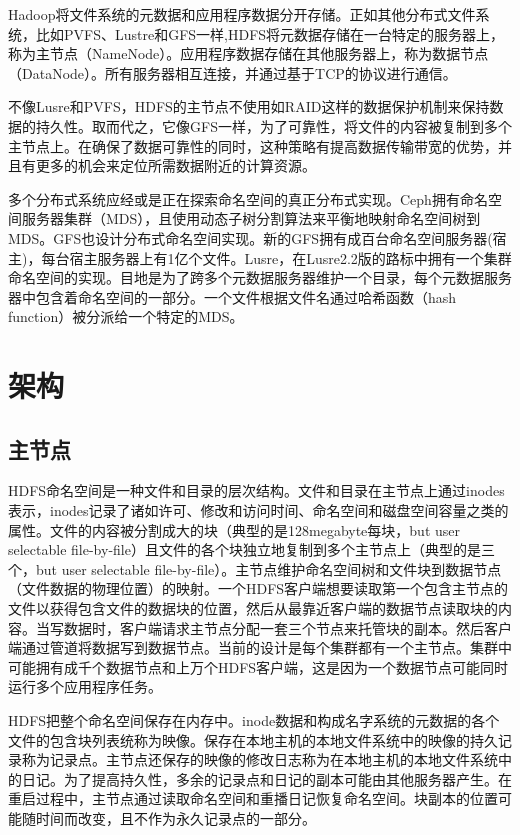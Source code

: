 Hadoop将文件系统的元数据和应用程序数据分开存储。正如其他分布式文件系统，比如PVFS、Lustre和GFS一样,HDFS将元数据存储在一台特定的服务器上，称为主节点（NameNode）。应用程序数据存储在其他服务器上，称为数据节点（DataNode）。所有服务器相互连接，并通过基于TCP的协议进行通信。

不像Lusre和PVFS，HDFS的主节点不使用如RAID这样的数据保护机制来保持数据的持久性。取而代之，它像GFS一样，为了可靠性，将文件的内容被复制到多个主节点上。在确保了数据可靠性的同时，这种策略有提高数据传输带宽的优势，并且有更多的机会来定位所需数据附近的计算资源。

多个分布式系统应经或是正在探索命名空间的真正分布式实现。Ceph拥有命名空间服务器集群（MDS），且使用动态子树分割算法来平衡地映射命名空间树到MDS。GFS也设计分布式命名空间实现。新的GFS拥有成百台命名空间服务器(宿主)，每台宿主服务器上有1亿个文件。Lusre，在Lusre2.2版的路标中拥有一个集群命名空间的实现。目地是为了跨多个元数据服务器维护一个目录，每个元数据服务器中包含着命名空间的一部分。一个文件根据文件名通过哈希函数（hash function）被分派给一个特定的MDS。

\section{架构}

\subsection{主节点}

HDFS命名空间是一种文件和目录的层次结构。文件和目录在主节点上通过inodes表示，inodes记录了诸如许可、修改和访问时间、命名空间和磁盘空间容量之类的属性。文件的内容被分割成大的块（典型的是128megabyte每块，but
user selectable file-by-file）且文件的各个块独立地复制到多个主节点上（典型的是三个，but user selectable file-by-file）。主节点维护命名空间树和文件块到数据节点（文件数据的物理位置）的映射。一个HDFS客户端想要读取第一个包含主节点的文件以获得包含文件的数据块的位置，然后从最靠近客户端的数据节点读取块的内容。当写数据时，客户端请求主节点分配一套三个节点来托管块的副本。然后客户端通过管道将数据写到数据节点。当前的设计是每个集群都有一个主节点。集群中可能拥有成千个数据节点和上万个HDFS客户端，这是因为一个数据节点可能同时运行多个应用程序任务。

HDFS把整个命名空间保存在内存中。inode数据和构成名字系统的元数据的各个文件的包含块列表统称为映像。保存在本地主机的本地文件系统中的映像的持久记录称为记录点。主节点还保存的映像的修改日志称为在本地主机的本地文件系统中的日记。为了提高持久性，多余的记录点和日记的副本可能由其他服务器产生。在重启过程中，主节点通过读取命名空间和重播日记恢复命名空间。块副本的位置可能随时间而改变，且不作为永久记录点的一部分。

